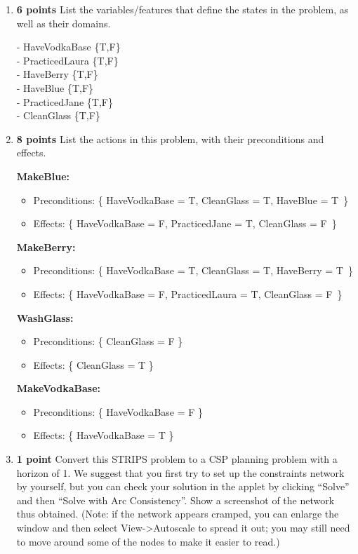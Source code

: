\documentclass{article}
\def\ans#1{{\color{ans}#1}}
\begin{document}
\begin{enumerate}[label=(\alph*)]
    \item \textbf{6 points} List the variables/features that define the states in the problem, as well as their domains.\\
    \ans{
        \begin{multicols}{2}
            - HaveVodkaBase \{T,F\} \\
            - PracticedLaura \{T,F\} \\
            - HaveBerry \{T,F\} \\
            - HaveBlue \{T,F\} \\
            - PracticedJane \{T,F\} \\
            - CleanGlass \{T,F\} \\
        \end{multicols}
    }
    \item \textbf{8 points} List the actions in this problem, with their preconditions and effects.\\
    \ans{
        \textbf{MakeBlue: }
        \begin{itemize}
            \item Preconditions: \{ HaveVodkaBase = T, CleanGlass = T, HaveBlue = T \}
            \item Effects: \{ HaveVodkaBase = F, PracticedJane = T, CleanGlass = F \}
        \end{itemize}
        \textbf{MakeBerry: }
        \begin{itemize}
            \item Preconditions: \{ HaveVodkaBase = T, CleanGlass = T, HaveBerry = T \}
            \item Effects: \{ HaveVodkaBase = F, PracticedLaura = T, CleanGlass = F \}
        \end{itemize}
        \textbf{WashGlass: }
        \begin{itemize}
            \item Preconditions: \{ CleanGlass = F \}
            \item Effects: \{ CleanGlass = T \}
        \end{itemize}
        \textbf{MakeVodkaBase: }
        \begin{itemize}
            \item Preconditions: \{ HaveVodkaBase = F \}
            \item Effects: \{ HaveVodkaBase = T \}
        \end{itemize}
    }
    \item \textbf{1 point} Convert this STRIPS problem to a CSP planning problem with a horizon of 1. We suggest that you first try to set up the constraints network by yourself, but you can check your solution in the applet by clicking “Solve” and then “Solve with Arc Consistency”. Show a screenshot of the network thus obtained. (Note: if the network appears cramped, you can enlarge the window and then select View->Autoscale to spread it out; you may still need to move around some of the nodes to make it easier to read.)\\

\end{enumerate}
\end{document}
